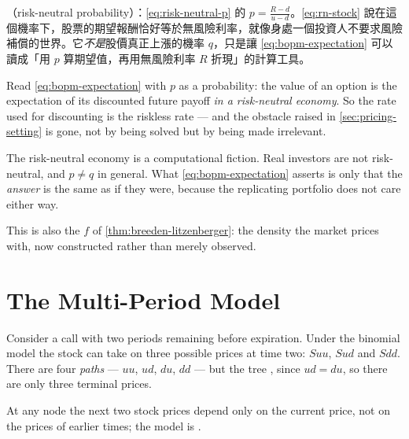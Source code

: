 \suppstart
\begin{remark}
	（risk-neutral probability）：\eqref{eq:risk-neutral-p} 的 $p=\frac{R-d}{u-d}$。\eqref{eq:rn-stock} 說在這個機率下，股票的期望報酬恰好等於無風險利率，就像身處一個投資人不要求風險補償的世界。它\emph{不是}股價真正上漲的機率 $q$，只是讓 \eqref{eq:bopm-expectation} 可以讀成「用 $p$ 算期望值，再用無風險利率 $R$ 折現」的計算工具。
\end{remark}
\suppend

\begin{moral}
	Read \eqref{eq:bopm-expectation} with $p$ as a probability: the value of an option is the expectation of its discounted future payoff \emph{in a risk-neutral economy}.
	So the rate used for discounting is the riskless rate --- and the obstacle raised in \autoref{sec:pricing-setting} is gone, not by being solved but by being made irrelevant.
\end{moral}

\suppstart
\begin{moral}
	The risk-neutral economy is a computational fiction. Real investors are not risk-neutral, and $p\ne q$ in general.
	What \eqref{eq:bopm-expectation} asserts is only that the \emph{answer} is the same as if they were, because the replicating portfolio does not care either way.

	This is also the $f$ of \autoref{thm:breeden-litzenberger}: the density the market prices with, now constructed rather than merely observed.
\end{moral}
\suppend

\section{The Multi-Period Model}
\label{sec:bopm-multi}


Consider a call with two periods remaining before expiration.
Under the binomial model the stock can take on three possible prices at time two: $Suu$, $Sud$ and $Sdd$.
There are four \emph{paths} --- $uu$, $ud$, $du$, $dd$ --- but the tree , since $ud=du$, so there are only three terminal prices.

At any node the next two stock prices depend only on the current price, not on the prices of earlier times; the model is .

